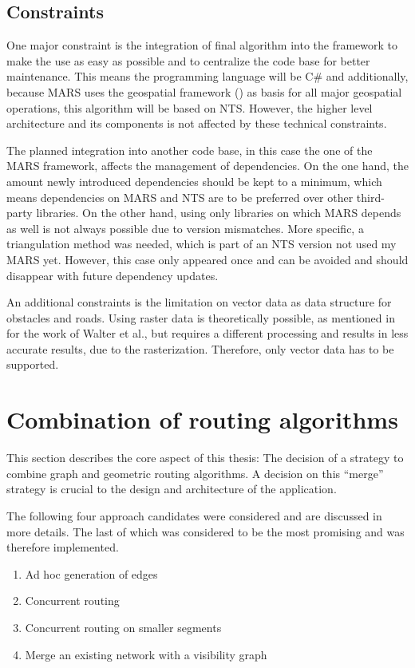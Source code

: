 	\subsection{Constraints}
	\label{subsec:constraints}
		
		One major constraint is the integration of final algorithm into the  framework to make the use as easy as possible and to centralize the code base for better maintenance.
		This means the programming language will be C\# and additionally, because MARS uses the geospatial framework  () as basis for all major geospatial operations, this algorithm will be based on NTS.
		However, the higher level architecture and its components is not affected by these technical constraints.
		
		The planned integration into another code base, in this case the one of the MARS framework, affects the management of dependencies.
		On the one hand, the amount newly introduced dependencies should be kept to a minimum, which means dependencies on MARS and NTS are to be preferred over other third-party libraries.
		On the other hand, using only libraries on which MARS depends as well is not always possible due to version mismatches.
		More specific, a triangulation method was needed, which is part of an NTS version not used my MARS yet.
		However, this case only appeared once and can be avoided and should disappear with future dependency updates.
		
		An additional constraints is the limitation on vector data as data structure for obstacles and roads.
		Using raster data is theoretically possible, as mentioned in  for the work of Walter et al., but requires a different processing and results in less accurate results, due to the rasterization.
		Therefore, only vector data has to be supported.
	
\section{Combination of routing algorithms}
\label{sec:combining-routing-algorithms}

	This section describes the core aspect of this thesis:
	The decision of a strategy to combine graph and geometric routing algorithms.
	A decision on this \enquote{merge} strategy is crucial to the design and architecture of the application.
	
	The following four approach candidates were considered and are discussed in more details.
	The last of which was considered to be the most promising and was therefore implemented.
	\begin{enumerate}
		\item Ad hoc generation of edges
		\item Concurrent routing
		\item Concurrent routing on smaller segments
		\item Merge an existing network with a visibility graph
	\end{enumerate}
	
